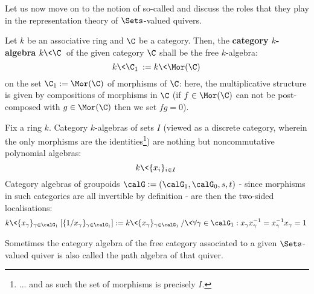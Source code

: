             Let us now move on to the notion of so-called  and discuss the roles that they play in the representation theory of $\Sets$-valued quivers. 
            \begin{definition} \label{def: category_algebras}
                Let $k$ be an associative ring and $\C$ be a category. Then, the \textbf{category $k$-algebra} $k\<\C\>$ of the given category $\C$ shall be the free $k$-algebra:
                    $$k\<\C_1\> := k\<\Mor(\C)\>$$
                on the set $\C_1 := \Mor(\C)$ of morphisms of $\C$: here, the multiplicative structure is given by compositions of morphisms in $\C$ (if $f\in \Mor(\C)$ can not be post-composed with $g \in \Mor(\C)$ then we set $fg = 0$).
            \end{definition}
            \begin{example}
                Fix a ring $k$. Category $k$-algebras of sets $I$ (viewed as a discrete category, wherein the only morphisms are the identities\footnote{... and as such the set of morphisms is precisely $I$.}) are nothing but noncommutative polynomial algebras:
                    $$k\<\{x_i\}_{i \in I}\>$$
                Category algebras of groupoids $\calG := (\calG_1, \calG_0, s, t)$ - since morphisms in such categories are all invertible by definition - are then the two-sided localisations:
                    $$k\<\{x_{\gamma}\}_{\gamma \in \calG_1}\>[\{1/x_\gamma\}_{\gamma \in \calG_1}] := k\<\{x_\gamma\}_{\gamma \in \calG_1}\>/\<\forall \gamma \in \calG_1: x_{\gamma} x_{\gamma}^{-1} = x_{\gamma}^{-1} x_{\gamma} = 1\>$$
            \end{example}
            \begin{convention}
                Sometimes the category algebra of the free category associated to a given $\Sets$-valued quiver is also called the path algebra of that quiver.
            \end{convention}
